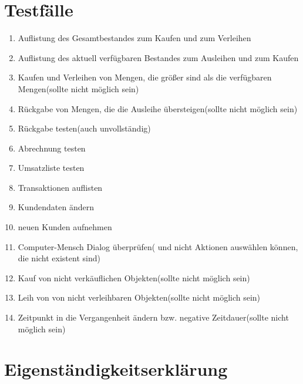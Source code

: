 \documentclass[a4paper,12pt]{report}
\begin{document}
\part{Testfälle}
\begin{enumerate}
\item
Auflistung des Gesamtbestandes zum Kaufen und zum Verleihen 
\item
Auflistung des aktuell verfügbaren Bestandes zum Ausleihen und zum Kaufen
\item
Kaufen und Verleihen von Mengen, die größer sind als die verfügbaren Mengen(sollte nicht möglich sein)
\item
Rückgabe von Mengen, die die Ausleihe übersteigen(sollte nicht möglich sein)
\item
Rückgabe testen(auch unvollständig)
\item
Abrechnung testen
\item
Umsatzliste testen
\item
Transaktionen auflisten
\item
Kundendaten ändern 
\item
neuen Kunden aufnehmen
\item
Computer-Mensch Dialog überprüfen( und nicht Aktionen auswählen können, die nicht existent sind)
\item
Kauf von nicht verkäuflichen Objekten(sollte nicht möglich sein)
\item
Leih von von nicht verleihbaren Objekten(sollte nicht möglich sein)
\item
Zeitpunkt in die Vergangenheit ändern bzw. negative Zeitdauer(sollte nicht möglich sein)

\end{enumerate}
\appendix
\part{Eigenständigkeitserklärung}
\end{document}
